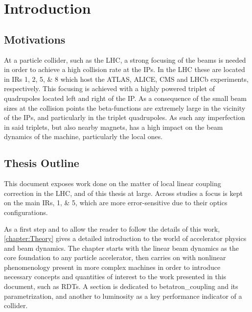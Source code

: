 \chapter{Introduction}
\label{chapter:introduction}


\section{Motivations}

At a particle collider, such as the \acrfull{LHC}, a strong focusing of the \glspl{beam} is needed in order to achieve a high collision rate at the \glspl{IP}.
In the LHC these are located in \glspl{IR} \numlist{1;2;5;8} which host the \acrshort{ATLAS}, \acrshort{ALICE}, \acrshort{CMS} and \acrshort{LHCb} \glspl{experiment}, respectively.
This focusing is achieved with a highly powered \gls{triplet} of quadrupoles located left and right of the IP.
As a consequence of the small beam sizes at the collision points the \glspl{beta-function} are extremely large in the vicinity of the IPs, and particularly in the triplet quadrupoles.
As such any imperfection in said triplets, but also nearby magnets, has a high impact on the beam dynamics of the machine, particularly the local ones.





\section{Thesis Outline}

This document exposes work done on the matter of local linear coupling correction in the LHC, and of this thesis at large.
Across studies a focus is kept on the main \glspl{IR}, \numlist{1;5}, which are more error-sensitive due to their optics configurations.

As a first step and to allow the reader to follow the details of this work, \cref{chapter:Theory} gives a detailed introduction to the world of accelerator physics and beam dynamics.
The chapter starts with the linear beam dynamics as the core foundation to any particle accelerator, then carries on with nonlinear phenomenology present in more complex machines in order to introduce necessary concepts and quantities of interest to the work presented in this document, such as \glspl{RDT}.
A section is dedicated to \gls{betatron_coupling} and its parametrization, and another to \gls{luminosity} as a key performance indicator of a collider.

